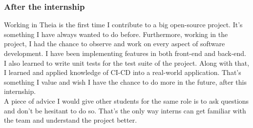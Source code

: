\subsubsection{After the internship}
Working in Theia is the first time I contribute to a big open-source project.
It's something I have always wanted to do before. 
Furthermore, working in the project, I had the chance to observe and work on every aspect of software development.
I have been implementing features in both front-end and back-end.
I also learned to write unit tests for the test suite of the project.
Along with that, I learned and applied knowledge of CI-CD into a real-world application.
That's something I value and wish I have the chance to do more in the future, after this internship. 
\\
A piece of advice I would give other students for the same role is to ask questions and don't be hesitant to do so.
That's the only way interns can get familiar with the team and understand the project better.
\\





